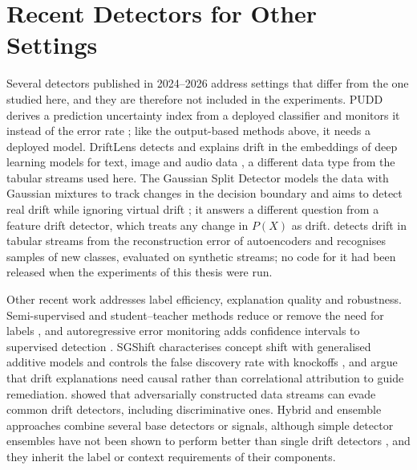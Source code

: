 \section{Recent Detectors for Other Settings}
\label{sec:lit-recent}
Several detectors published in 2024--2026 address settings that differ from the one studied here, and they are therefore not included in the experiments. PUDD derives a prediction uncertainty index from a deployed classifier and monitors it instead of the error rate \citep{PUDD2025}; like the output-based methods above, it needs a deployed model. DriftLens detects and explains drift in the embeddings of deep learning models for text, image and audio data \citep{DriftLens2024}, a different data type from the tabular streams used here. The Gaussian Split Detector models the data with Gaussian mixtures to track changes in the decision boundary and aims to detect real drift while ignoring virtual drift \citep{GaussianSplit2024}; it answers a different question from a feature drift detector, which treats any change in $P(X)$ as drift. \citet{Komorniczak2026} detects drift in tabular streams from the reconstruction error of autoencoders and recognises samples of new classes, evaluated on synthetic streams; no code for it had been released when the experiments of this thesis were run.

Other recent work addresses label efficiency, explanation quality and robustness. Semi-supervised and student--teacher methods reduce or remove the need for labels \citep{CDSeer2024, STUDD2022}, and autoregressive error monitoring adds confidence intervals to supervised detection \citep{ADDM2022}. SGShift characterises concept shift with generalised additive models and controls the false discovery rate with knockoffs \citep{SGShift2025}, and \citet{CausalDrift2025} argue that drift explanations need causal rather than correlational attribution to guide remediation. \citet{AdvAttackDrift2024} showed that adversarially constructed data streams can evade common drift detectors, including discriminative ones. Hybrid and ensemble approaches combine several base detectors or signals, although simple detector ensembles have not been shown to perform better than single drift detectors \citep{Krawczyk2017}, and they inherit the label or context requirements of their components.

